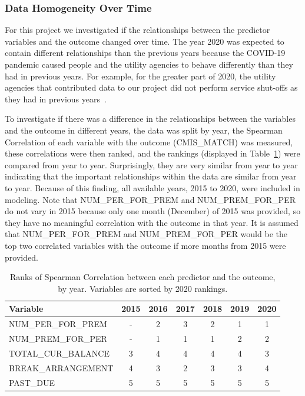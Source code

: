 \documentclass[10pt,letterpaper]{article}
\begin{document}
\subsubsection*{Data Homogeneity Over Time}
For this project we investigated if the relationships between the predictor variables and the outcome changed over time. The year 2020 was expected to contain different relationships than the previous years because the COVID-19 pandemic caused people and the utility agencies to behave differently than they had in previous years. For example, for the greater part of 2020, the utility agencies that contributed data to our project did not perform service shut-offs as they had in previous years~\cite{white2020utilities}. 

To investigate if there was a difference in the relationships between the variables and the outcome in different years, the data was split by year, the Spearman Correlation of each variable with the outcome (CMIS\_MATCH) was measured, these correlations were then ranked, and the rankings (displayed in Table~\ref{tbl:corr_years}) were compared from year to year. Surprisingly, they are very similar from year to year indicating that the important relationships within the data are similar from year to year. Because of this finding, all available years, 2015 to 2020, were included in modeling. Note that NUM\_PER\_FOR\_PREM and NUM\_PREM\_FOR\_PER do not vary in 2015 because only one month (December) of 2015 was provided, so they have no meaningful correlation with the outcome in that year. It is assumed that NUM\_PER\_FOR\_PREM and NUM\_PREM\_FOR\_PER would be the top two correlated variables with the outcome if more months from 2015 were provided.

\begin{table}[!h]
    \centering
    \begin{tabular}{lcccccc}
        \toprule
                 Variable &  2015 &  2016 &  2017 &  2018 &  2019 &  2020 \\
        \midrule
        NUM\_PER\_FOR\_PREM &     - &     2 &     3 &     2 &     1 &     1 \\
        NUM\_PREM\_FOR\_PER &     - &     1 &     1 &     1 &     2 &     2 \\
        TOTAL\_CUR\_BALANCE &     3 &     4 &     4 &     4 &     4 &     3 \\
        BREAK\_ARRANGEMENT  &     4 &     3 &     2 &     3 &     3 &     4 \\
        PAST\_DUE           &     5 &     5 &     5 &     5 &     5 &     5 \\
        \bottomrule
    \end{tabular}
\caption{Ranks of Spearman Correlation between each predictor and the outcome, by year. Variables are sorted by 2020 rankings.}
\label{tbl:corr_years}
\end{table}
\end{document}
